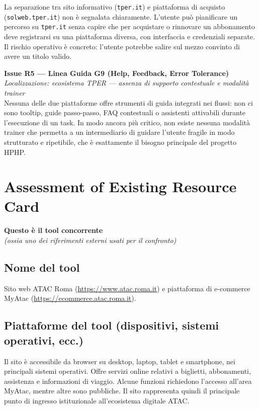 \documentclass[11pt,a4paper]{article}
\begin{document}
\noindent La separazione tra sito informativo (\texttt{tper.it}) e
piattaforma di acquisto (\texttt{solweb.tper.it}) non è segnalata
chiaramente. L'utente può pianificare un percorso su \texttt{tper.it}
senza capire che per acquistare o rinnovare un abbonamento deve
registrarsi su una piattaforma diversa, con interfaccia e credenziali
separate. Il rischio operativo è concreto: l'utente potrebbe salire
sul mezzo convinto di avere un titolo valido.

\bigskip

\noindent\textbf{Issue R5 — Linea Guida G9 (Help, Feedback, Error
Tolerance)}\label{iss:R5}\\
\textit{Localizzazione: ecosistema TPER — assenza di supporto
contestuale e modalità trainer}\\

\noindent Nessuna delle due piattaforme offre strumenti di guida
integrati nei flussi: non ci sono tooltip, guide passo-passo, FAQ
contestuali o assistenti attivabili durante l'esecuzione di un task.
In modo ancora più critico, non esiste nessuna modalità trainer che
permetta a un intermediario di guidare l'utente fragile in modo
strutturato e ripetibile, che è esattamente il bisogno principale
del progetto HPHP.

\newpage

\section*{Assessment of Existing Resource Card}

\textbf{Questo è il tool concorrente}\\
\textit{(ossia uno dei riferimenti esterni usati per il confronto)}

\subsection*{Nome del tool}

\noindent Sito web ATAC Roma (\url{https://www.atac.roma.it}) e piattaforma
di e-commerce MyAtac (\url{https://ecommerce.atac.roma.it}).

\subsection*{Piattaforme del tool (dispositivi, sistemi operativi, ecc.)}

\noindent Il sito è accessibile da browser su desktop, laptop, tablet e smartphone, nei principali sistemi operativi. Offre servizi online relativi a biglietti, abbonamenti, assistenza e informazioni di viaggio. Alcune funzioni richiedono l’accesso all’area MyAtac, mentre altre sono pubbliche. Il sito rappresenta quindi il principale punto di ingresso istituzionale all’ecosistema digitale ATAC.
\end{document}
